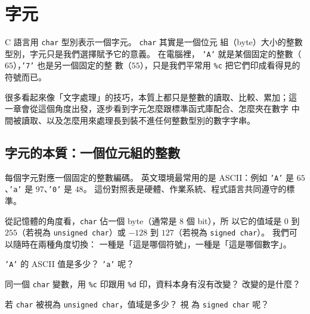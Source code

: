 \chapter{字元}
\label{ch:character}

C 語言用 \texttt{char} 型別表示一個字元。 \texttt{char} 其實是一個位元
組（byte）大小的整數型別，字元只是我們選擇賦予它的意義。 在電腦裡，
\texttt{'A'} 就是某個固定的整數（$65$），\texttt{'7'} 也是另一個固定的整
數（$55$），只是我們平常用 \texttt{\%c} 把它們印成看得見的符號而已。

很多看起來像「文字處理」的技巧，本質上都只是整數的讀取、比較、累加；這
一章會從這個角度出發，逐步看到字元怎麼跟標準函式庫配合、怎麼夾在數字
中間被讀取、以及怎麼用來處理長到裝不進任何整數型別的數字字串。

\section{字元的本質：一個位元組的整數}
\label{sec:char-nature}

每個字元對應一個固定的整數編碼。 英文環境最常用的是 ASCII：例如
\texttt{'A'} 是 $65$、\texttt{'a'} 是 $97$、\texttt{'0'} 是 $48$。
這份對照表是硬體、作業系統、程式語言共同遵守的標準。

從記憶體的角度看，\texttt{char} 佔一個 byte（通常是 $8$ 個 bit），所
以它的值域是 $0$ 到 $255$（若視為 \texttt{unsigned char}）或 $-128$
到 $127$（若視為 \texttt{signed char}）。 我們可以隨時在兩種角度切換：
一種是「這是哪個符號」，一種是「這是哪個數字」。

\begin{center}
\label{fig:ch10-char-ascii}
\end{center}


\begin{drills}[label=drills:char-nature]
\item \texttt{'A'} 的 ASCII 值是多少？ \texttt{'a'} 呢？
\item 同一個 \texttt{char} 變數，用 \texttt{\%c} 印跟用 \texttt{\%d}
印，資料本身有沒有改變？ 改變的是什麼？
\item 若 \texttt{char} 被視為 \texttt{unsigned char}，值域是多少？ 視
為 \texttt{signed char} 呢？
\end{drills}

